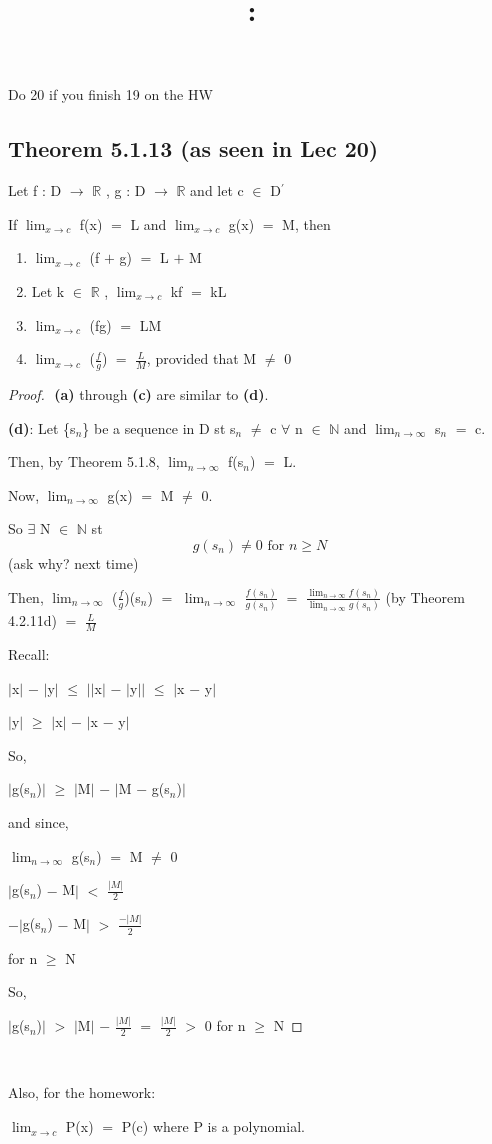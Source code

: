 \documentclass{article}
\title{
    \vspace{2in}
    \textmd{\textbf{\hmwkClass:\ \hmwkTitle}}\\
    \normalsize\vspace{0.1in}\small\vspace{0.1in}\large{\textit{\hmwkClassInstructor}}
    \vspace{3in}
}
\author{\hmwkAuthorName}
\date{}
\newcommand{\mt}[1]{\ensuremath{#1}}
\newcommand\ssc[2][\DefaultOpt]{%
  \def\DefaultOpt{#2}%
  \subsection[#1]{#2}%
}
\newcommand{\bgpf}{\begin{proof} $ $\newline}
\newcommand{\balist}{\begin{enumerate}[label=\alph*.]}
\newcommand{\elist}{\end{enumerate}}
\newcommand{\bpth}[1]{\textbf{(#1)}}
\newcommand{\epf}{\end{proof}}
\newcommand{\br}{\mt{\mathbb{R}} }       %
\newcommand{\bn}{\mt{\mathbb{N}} }       %
\newcommand{\fa}{\mt{\forall} }          %
\newcommand{\mem}{\mt{\in} }
\newcommand{\exs}{\mt{\exists} }
\newcommand{\lra}{ \mt{\longrightarrow} } %
\newcommand{\av}[1]{\mt{|}#1\mt{|}}  %
\newcommand{\bk}[1]{\{#1\}}
\newcommand{\ps}{\mt{+} }
\newcommand{\ms}{\mt{-} }
\newcommand{\ls}{\mt{<} }
\newcommand{\gr}{\mt{>} }
\newcommand{\lse}{\mt{\leq} }
\newcommand{\gre}{\mt{\geq} }
\newcommand{\eql}{\mt{=} }
\newcommand{\pr}{\mt{^\prime} } 		   %
\newcommand{\uw}[2]{#1\mt{_{#2}}}
\newcommand{\frc}[2]{\mt{\frac{#1}{#2}}}
\newcommand{\lmti}[1]{\mt{\displaystyle{\lim_{#1 \to \infty}}}}
\newcommand{\limt}[2]{\mt{\displaystyle{\lim_{#1 \to #2}}}}
\newcommand{\eqn}[1]{\[#1\]}
\begin{document}
Do 20 if you finish 19 on the HW

\ssc{Theorem 5.1.13 (as seen in Lec 20)}{

Let f : D \lra \br, g : D \lra \br and let c \mem D\pr

If \limt{x}{c} f(x) \eql L and \limt{x}{c} g(x) \eql M, then

\balist
\item \limt{x}{c} (f \ps g) \eql L \ps M
\item Let k \mem \br, \limt{x}{c} kf \eql kL
\item \limt{x}{c} (fg) \eql LM
\item \limt{x}{c} (\frc{f}{g}) \eql \frc{L}{M}, provided that M $\neq$ 0
\elist

\bgpf
\bpth{a} through \bpth{c} are similar to \bpth{d}.

\bpth{d}: Let \bk{\uw{s}{n}} be a sequence in D st \uw{s}{n} $\neq$ c \fa n \mem \bn and \lmti{n} \uw{s}{n} \eql c.

Then, by Theorem 5.1.8, \lmti{n} f(\uw{s}{n}) \eql L.

Now, \lmti{n} g(x) \eql M $\neq$ 0.

So \exs N \mem \bn st
\eqn{g(s_n) \neq 0 \textrm{ for } n \gre N}
(ask why? next time)

Then, \lmti{n} (\frc{f}{g})(\uw{s}{n}) \eql \lmti{n} \frc{f(s_n)}{g(s_n)} \eql \frc{\lmti{n} f(s_n)}{\lmti{n} g(s_n)} (by Theorem 4.2.11d) \eql \frc{L}{M}

Recall:

\av{x} \ms \av{y} \lse \av{\av{x} \ms \av{y}} \lse \av{x \ms y}

\av{y} \gre \av{x} \ms \av{x \ms y}

So,

\av{g(\uw{s}{n})} \gre \av{M} \ms \av{M \ms g(\uw{s}{n})}

and since,

\lmti{n} g(\uw{s}{n}) \eql M $\neq$ 0

\av{g(\uw{s}{n}) \ms M} \ls \frc{\av{M}}{2}

$-$\av{g(\uw{s}{n}) \ms M} \gr \frc{-\av{M}}{2}

for n \gre N

So,

\av{g(\uw{s}{n})} \gr \av{M} \ms \frc{\av{M}}{2} \eql \frc{\av{M}}{2} \gr 0 for n \gre N 
\epf 
}

\

Also, for the homework:

\limt{x}{c} P(x) \eql P(c) where P is a polynomial.
\end{document}
